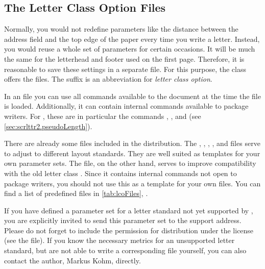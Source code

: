\subsection{The Letter Class Option Files}
\label{sec:scrlttr2.lcoFile}

%
Normally, you would not redefine parameters like the distance between
the address field and the top edge of the paper every time you write a
letter. Instead, you would reuse a whole set of parameters for certain
occasions. It will be much the same for the letterhead and footer used
on the first page. Therefore, it is reasonable to save these settings
in a separate file. For this purpose, the  class
offers the  files. The  suffix is an abbreviation
for \emph{\emph{l}etter \emph{c}lass \emph{o}ption}.

In an  file you can use all commands available to the
document at the time the  file is loaded.  Additionally, it
can contain internal commands available to package writers. For
, these are in particular the commands
, , and 
(see \autoref{sec:scrlttr2.pseudoLength}).

There are already some  files included in the {\KOMAScript}
distribution. The , , ,
, and  files
serve to adjust {\KOMAScript} to different layout standards. They are well
suited as templates for your own parameter sets. The  file,
on the other hand, serves to improve compatibility with the old letter class
.  Since it contains internal commands not open to package
writers, you should not use this as a template for your own 
files. You can find a list of predefined  files in
\autoref{tab:lcoFiles}, .

\begin{Explain}
  If you have defined a parameter set for a letter standard not yet
  supported by \KOMAScript, you are explicitly invited to send this
  parameter set to the {\KOMAScript} support address. Please do not
  forget to include the permission for distribution under the
  {\KOMAScript} license (see the  file). If you know
  the necessary metrics for an unsupported letter standard, but are
  not able to write a corresponding  file yourself, you can
  also contact the {\KOMAScript} author, Markus Kohm, directly.
\end{Explain}

